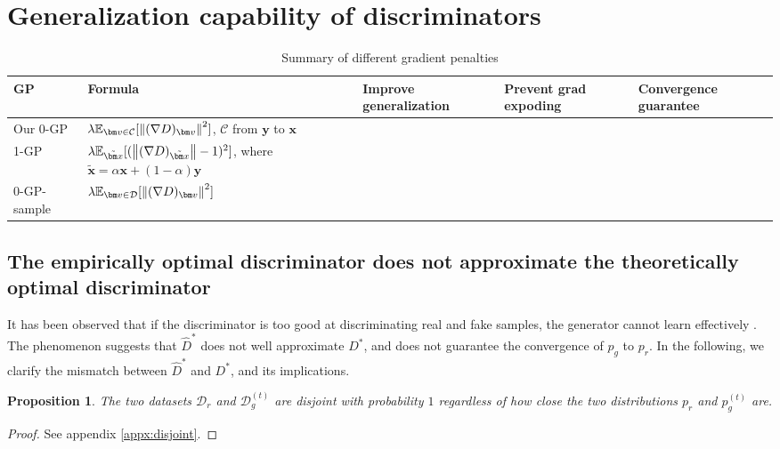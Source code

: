 \documentclass{article} %
\newcommand{\cmark}{\ding{51}}%
\newcommand{\xmark}{\ding{55}}%
\newtheorem{proposition}{Proposition}
\begin{document}
\section{Generalization capability of discriminators}
\label{generalization}
\begin{table}
\centering
\begin{tabular}{|p{2cm}|p{4cm}|p{2cm}|p{2cm}|p{2cm}|}
\hline
GP & Formula & Improve generalization & Prevent grad expoding & Convergence guarantee \\
\hline
\hline
Our 0-GP & $\lambda \mathbb{E}_{\bm v \in \mathcal{C}}[\norm{(\nabla D)_{\bm v}}^2]$, $\mathcal{C}$ from $\bm y$ to $\bm x$ & \cmark & \cmark & \cmark \\
\hline
1-GP & $\lambda \mathbb{E}_{\tilde{\bm x}}[(\norm{(\nabla D)_{\tilde{\bm x}}} - 1)^2]$, where $\tilde{\bm x} = \alpha \bm x + (1 - \alpha) \bm y$ & \xmark & \cmark & \xmark \\
\hline
0-GP-sample & $\lambda \mathbb{E}_{\bm v \in \mathcal{D}}[\norm{(\nabla D)_{\bm v}}^2]$ & \xmark & \xmark & \cmark \\
\hline
\end{tabular}
\caption{Summary of different gradient penalties}
\label{tab:compare}
\end{table}

\subsection{The empirically optimal discriminator does not approximate the theoretically optimal discriminator}
It has been observed that if the discriminator is too good at discriminating real and fake samples, the generator cannot learn effectively \citep{gan, towardPrincipledGAN}. The phenomenon suggests that $\hat{D}^*$ does not well approximate $D^*$, and does not guarantee the convergence of $p_g$ to $p_r$. In the following, we clarify the mismatch between $\hat{D}^*$ and $D^*$, and its implications.

\begin{proposition}
The two datasets $\mathcal{D}_r$ and $\mathcal{D}_g^{(t)}$ are disjoint with probability $1$ regardless of how close the two distributions $p_r$ and $p_g^{(t)}$ are.
\label{prop:disjoint}
\end{proposition}
\begin{proof}
See appendix \ref{appx:disjoint}.
\end{proof}
\end{document}

